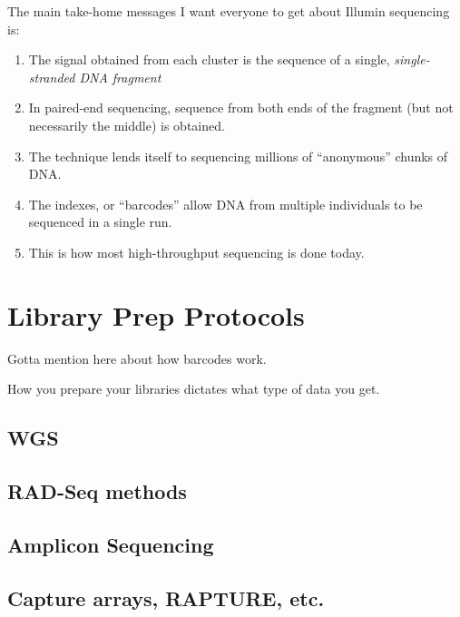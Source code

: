 \documentclass[]{krantz}
\providecommand{\tightlist}{%
  \setlength{\itemsep}{0pt}\setlength{\parskip}{0pt}}
\begin{document}
The main take-home messages I want everyone to get about Illumin sequencing is:

\begin{enumerate}
\def\labelenumi{\arabic{enumi}.}
\tightlist
\item
  The signal obtained from each cluster is the sequence of a single, \emph{single-stranded DNA fragment}
\item
  In paired-end sequencing, sequence from both ends of the fragment (but not necessarily
  the middle) is obtained.
\item
  The technique lends itself to sequencing millions of ``anonymous'' chunks of DNA.
\item
  The indexes, or ``barcodes'' allow DNA from multiple individuals to be sequenced in a single run.
\item
  This is how most high-throughput sequencing is done today.
\end{enumerate}

\hypertarget{library-prep-protocols}{%
\section{Library Prep Protocols}\label{library-prep-protocols}}

Gotta mention here about how barcodes work.

How you prepare your libraries dictates what type of data you get.

\hypertarget{wgs}{%
\subsection{WGS}\label{wgs}}

\hypertarget{rad-seq-methods}{%
\subsection{RAD-Seq methods}\label{rad-seq-methods}}

\hypertarget{amplicon-sequencing}{%
\subsection{Amplicon Sequencing}\label{amplicon-sequencing}}

\hypertarget{capture-arrays-rapture-etc.}{%
\subsection{Capture arrays, RAPTURE, etc.}\label{capture-arrays-rapture-etc.}}
\end{document}
